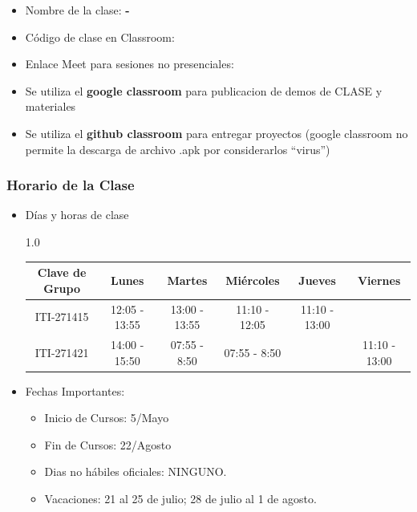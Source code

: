 


\begin{frame}
\begin{itemize}
\frametitle{Plataforma Virtual para el Curso}
\item Nombre de la clase: \textbf{\nombreMateria-\cuatrimestre}
\item Código de clase en Classroom: \textbf{\claveClassroom}
\item Enlace Meet para sesiones no presenciales: \textbf{\claveMeet}
\item Se utiliza el \textbf{google classroom} para publicacion de demos de CLASE y materiales
\item Se utiliza el \textbf{github classroom} para entregar proyectos (google classroom no permite la descarga de archivo .apk por considerarlos ``virus'')
\end{itemize}
\end{frame}



\begin{frame}
\frametitle{Horario de la Clase}


\begin{itemize}
\item Días y horas de clase
\tiny
\begin{spacing}{1.0}
\begin{center}
\begin{tabular}{c|ccccc}
\hline 
\textbf{Clave de Grupo}   & Lunes         & Martes        & Miércoles     & Jueves        & Viernes          \\ \hline 
ITI-271415                & 12:05 - 13:55 & 13:00 - 13:55 & 11:10 - 12:05 & 11:10 - 13:00 &     \\ \hline
ITI-271421                & 14:00 - 15:50 & 07:55 - 8:50  & 07:55 - 8:50  &               & 11:10 - 13:00      \\ \hline                    
\hline
\end{tabular}
\end{center}
\end{spacing}
\normalsize
\item Fechas Importantes:
\begin{itemize}
\item Inicio de Cursos: 5/Mayo
\item Fin de Cursos: 22/Agosto
\item Dias no hábiles oficiales: NINGUNO.
\item Vacaciones: 21 al 25 de julio; 28 de julio al 1 de agosto.  
\end{itemize}
\end{itemize}

\end{frame}


